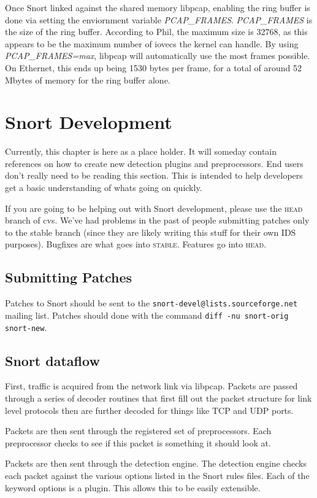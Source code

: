 \documentclass[english]{report}
\begin{document}
Once Snort linked against the shared memory libpcap, enabling the ring buffer is done via setting the enviornment variable \emph{PCAP\_FRAMES}.  \emph{PCAP\_FRAMES} is the size of the ring buffer.  According to Phil, the maximum size is 32768, as this appears to be the maximum number of iovecs the kernel can handle.  By using \emph{PCAP\_FRAMES=max}, libpcap will automatically use the most frames possible.  On Ethernet, this ends up being 1530 bytes per frame, for a total of around 52 Mbytes of memory for the ring buffer alone.

\newpage
\chapter{Snort Development}

Currently, this chapter is here as a place holder. It will someday
contain references on how to create new detection plugins and
preprocessors.  End users don't really need to be reading this
section. This is intended to help developers get a basic understanding
of whats going on quickly.

If you are going to be helping out with Snort development, please
use the \textsc{head} branch of cvs. We've had problems in the past
of people submitting patches only to the stable branch (since they
are likely writing this stuff for their own IDS purposes). Bugfixes
are what goes into \textsc{stable}. Features go into \textsc{head}.

\section{Submitting Patches}
Patches to Snort should be sent to the \verb!snort-devel@lists.sourceforge.net!
mailing list.  Patches should done with the command \verb!diff -nu snort-orig snort-new!.

\section{Snort dataflow}
First, traffic is acquired from the network link via libpcap. Packets
are passed through a series of decoder routines that first fill out
the packet structure for link level protocols then are further decoded
for things like TCP and UDP ports.

Packets are then sent through the registered set of preprocessors.
Each preprocessor checks to see if this packet is something it should
look at.

Packets are then sent through the detection engine. The detection
engine checks each packet against the various options listed in the
Snort rules files. Each of the keyword options is a plugin. This allows
this to be easily extensible.
\end{document}
